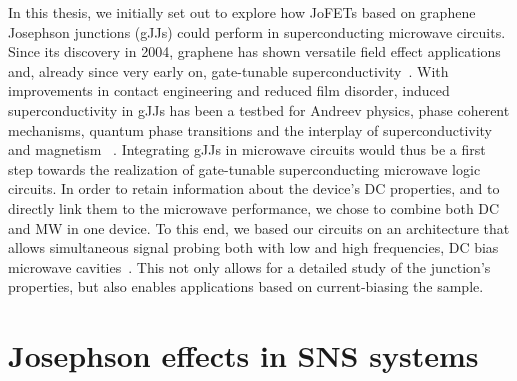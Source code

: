 In this thesis, we initially set out to explore how JoFETs based on graphene Josephson junctions (gJJs) could perform in superconducting microwave circuits.
%
Since its discovery in 2004, graphene has shown versatile field effect applications and, already since very early on, gate-tunable superconductivity~\cite{novoselovElectricFieldEffect2004c,heerscheBipolarSupercurrentGraphene2007a}.
%
With improvements in contact engineering and reduced film disorder, induced superconductivity in gJJs has been a testbed for Andreev physics, phase coherent mechanisms, quantum phase transitions and the interplay of superconductivity and magnetism ~\cite{leeProximityCouplingSuperconductorgraphene2018a}.
%
Integrating gJJs in microwave circuits would thus be a first step towards the realization of gate-tunable superconducting microwave logic circuits.
%
In order to retain information about the device's DC properties, and to directly link them to the microwave performance, we chose to combine both DC and MW in one device.
%
To this end, we based our circuits on an architecture that allows simultaneous signal probing both with low and high frequencies, DC bias microwave cavities~\cite{bosmanBroadbandArchitectureGalvanically2015c}.
%
This not only allows for a detailed study of the junction's properties, but also enables applications based on current-biasing the sample.







\section{Josephson effects in SNS systems}

